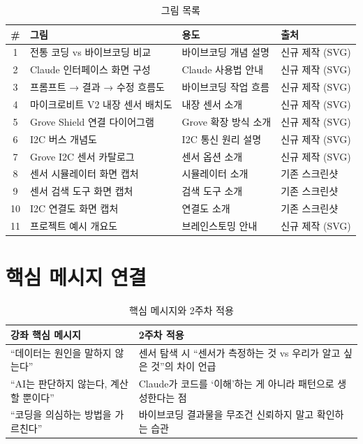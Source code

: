 \documentclass[11pt, a4paper]{article}
\begin{document}
\begin{table}[H]\centering
\caption{그림 목록}
\small
\begin{tabular}{clll}\toprule
\textbf{\#} & \textbf{그림} & \textbf{용도} & \textbf{출처} \\\midrule
1 & 전통 코딩 vs 바이브코딩 비교 & 바이브코딩 개념 설명 & 신규 제작 (SVG) \\
2 & Claude 인터페이스 화면 구성 & Claude 사용법 안내 & 신규 제작 (SVG) \\
3 & 프롬프트 → 결과 → 수정 흐름도 & 바이브코딩 작업 흐름 & 신규 제작 (SVG) \\
4 & 마이크로비트 V2 내장 센서 배치도 & 내장 센서 소개 & 신규 제작 (SVG) \\
5 & Grove Shield 연결 다이어그램 & Grove 확장 방식 소개 & 신규 제작 (SVG) \\
6 & I2C 버스 개념도 & I2C 통신 원리 설명 & 신규 제작 (SVG) \\
7 & Grove I2C 센서 카탈로그 & 센서 옵션 소개 & 신규 제작 (SVG) \\
8 & 센서 시뮬레이터 화면 캡처 & 시뮬레이터 소개 & 기존 스크린샷 \\
9 & 센서 검색 도구 화면 캡처 & 검색 도구 소개 & 기존 스크린샷 \\
10 & I2C 연결도 화면 캡처 & 연결도 소개 & 기존 스크린샷 \\
11 & 프로젝트 예시 개요도 & 브레인스토밍 안내 & 신규 제작 (SVG) \\
\bottomrule
\end{tabular}
\end{table}

\section{핵심 메시지 연결}

\begin{table}[H]\centering
\caption{핵심 메시지와 2주차 적용}
\begin{tabular}{p{5cm}p{7.5cm}}\toprule
\textbf{강좌 핵심 메시지} & \textbf{2주차 적용} \\\midrule
``데이터는 원인을 말하지 않는다'' & 센서 탐색 시 ``센서가 측정하는 것 vs 우리가 알고 싶은 것''의 차이 언급 \\
``AI는 판단하지 않는다, 계산할 뿐이다'' & Claude가 코드를 `이해'하는 게 아니라 패턴으로 생성한다는 점 \\
``코딩을 의심하는 방법을 가르친다'' & 바이브코딩 결과물을 무조건 신뢰하지 말고 확인하는 습관 \\
\bottomrule
\end{tabular}
\end{table}
\end{document}
